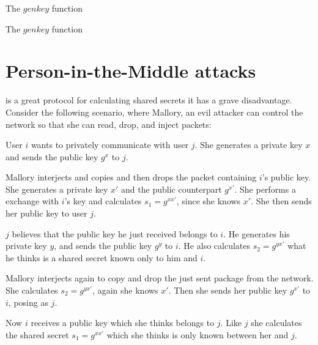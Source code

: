 \begin{algorithm}[h]
  \caption{The $genkey$ function}
  \label{algo:dh_genkey}
\end{algorithm}

\begin{algorithm}[h]
  \caption{The $genkey$ function}
  \label{algo:dh_calculate_secret}
\end{algorithm}

\section{Person-in-the-Middle attacks}

\dhname is a great protocol for calculating shared secrets it has a grave disadvantage.
Consider the following scenario, where Mallory, an evil attacker can control the network so that she can read, drop, and inject packets:

User $i$ wants to privately communicate with user $j$.
She generates a private key $x$ and sends the public key $g^x$ to $j$.

Mallory interjects and copies and then drops the packet containing $i$'s public key.
She generates a private key $x\prime$ and the public counterpart $g^{x\prime}$.
She performs a \dhname exchange with $i$'s key and calculates $s_1 = g^{xx\prime}$, since she knows $x\prime$.
She then sends her public key to user $j$.

$j$ believes that the public key he just received belongs to $i$.
He generates his private key $y$, and sends the public key $g^y$ to $i$.
He also calculates $s_2 = g^{yx\prime}$ what he thinks is a shared secret known only to him and $i$.

Mallory interjects again to copy and drop the just sent package from the network.
She calculates $s_2 = g^{yx\prime}$, again she knows $x\prime$.
Then she sends her public key $g^{x\prime}$ to $i$, posing as $j$.

Now $i$ receives a public key which she thinks belongs to $j$.
Like $j$ she calculates the shared secret $s_1 = g^{xx\prime}$ which she thinks is only known between her and $j$.

